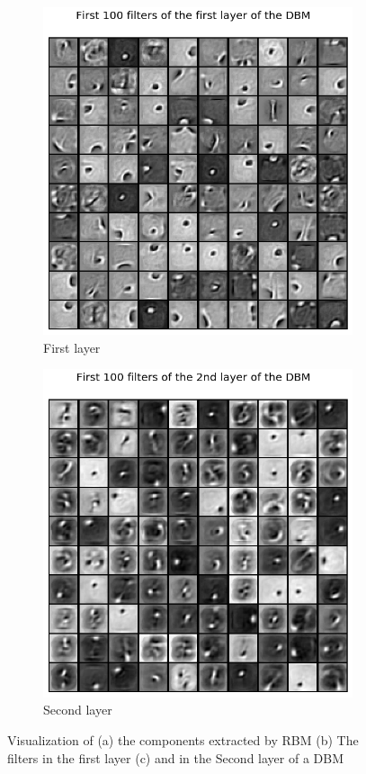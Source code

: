 \documentclass[11pt,conference,compsoc]{IEEEtran}
\begin{document}
\begin{figure}[]
\begin{subfigure}{0.30\linewidth}
            \includegraphics[width=\linewidth]{images/dbm_1.png}
            \caption{First layer}
        \end{subfigure}  
        \begin{subfigure}{0.30\linewidth}
            \includegraphics[width=\linewidth]{images/dbm_2.png}
            \caption{Second layer}
        \end{subfigure}        
        \caption{ Visualization of (a) the components extracted by RBM (b) The filters in the first layer (c) and in the Second layer of a DBM }
        \label{fig:15}
\end{figure}
\end{document}
